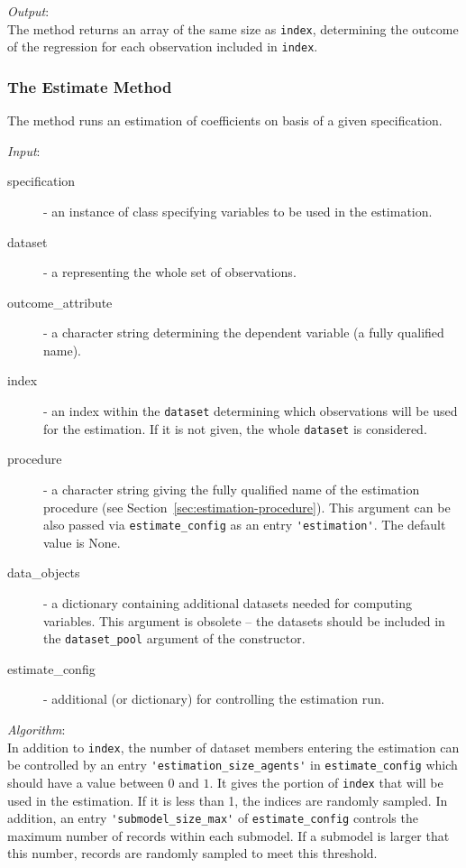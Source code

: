 {\it Output}:~\\[1mm]
The method returns an array of the same size as \verb|index|, determining the
outcome of the regression for each observation included in \verb|index|.

\subsubsection{The Estimate Method}
The  method runs an estimation of coefficients on basis of
a given specification.

{\it Input}:
\begin{description}
\item[specification] - an instance of class 
  specifying variables to be used in the estimation.
\item[dataset] - a  representing the whole set of observations.
\item[outcome_attribute] - a character string determining the dependent
  variable (a fully qualified name).
\item[index] - an index within the \verb|dataset| determining which
  observations will be used for the estimation. If it is not given, the whole
  \verb|dataset| is considered.
\item[procedure] - a character string giving the fully qualified name of the
  estimation procedure (see Section~\ref{sec:estimation-procedure}). This argument can be also passed via
  \verb|estimate_config| as an entry \verb|'estimation'|. The default value is None.
\item[data_objects] - a dictionary containing additional datasets 
  needed for computing variables. This argument is obsolete -- the datasets should be 
  included in the \verb|dataset_pool| argument of the constructor.
\item[estimate_config] - additional  (or dictionary) for controlling the
  estimation run.
\end{description}

{\it Algorithm}:~\\[1mm]
In addition to \verb|index|, the number of dataset members entering the
estimation can be controlled by an entry \verb|'estimation_size_agents'| in
\verb|estimate_config| which should have a value between $0$ and $1$. It gives
the portion of \verb|index| that will be used in the estimation. If it is less than 1, 
the indices are randomly sampled. In addition, an entry \verb|'submodel_size_max'| of 
\verb|estimate_config| controls the maximum number of records within each submodel.
If a submodel is larger that this number, records are randomly sampled to meet this threshold.

